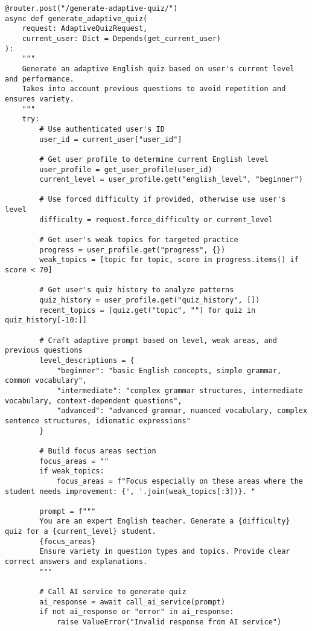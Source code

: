 \documentclass[12pt,a4paper]{article}
\begin{document}
\begin{lstlisting}[style=pythonstyle, caption=Generatore Quiz AI - Logica Adattiva, label=lst:quizgen]
@router.post("/generate-adaptive-quiz/")
async def generate_adaptive_quiz(
    request: AdaptiveQuizRequest,
    current_user: Dict = Depends(get_current_user)
):
    """
    Generate an adaptive English quiz based on user's current level and performance.
    Takes into account previous questions to avoid repetition and ensures variety.
    """
    try:
        # Use authenticated user's ID
        user_id = current_user["user_id"]
        
        # Get user profile to determine current English level
        user_profile = get_user_profile(user_id)
        current_level = user_profile.get("english_level", "beginner")
        
        # Use forced difficulty if provided, otherwise use user's level
        difficulty = request.force_difficulty or current_level
        
        # Get user's weak topics for targeted practice
        progress = user_profile.get("progress", {})
        weak_topics = [topic for topic, score in progress.items() if score < 70]
        
        # Get user's quiz history to analyze patterns
        quiz_history = user_profile.get("quiz_history", [])
        recent_topics = [quiz.get("topic", "") for quiz in quiz_history[-10:]]
        
        # Craft adaptive prompt based on level, weak areas, and previous questions
        level_descriptions = {
            "beginner": "basic English concepts, simple grammar, common vocabulary",
            "intermediate": "complex grammar structures, intermediate vocabulary, context-dependent questions",
            "advanced": "advanced grammar, nuanced vocabulary, complex sentence structures, idiomatic expressions"
        }
        
        # Build focus areas section
        focus_areas = ""
        if weak_topics:
            focus_areas = f"Focus especially on these areas where the student needs improvement: {', '.join(weak_topics[:3])}. "
        
        prompt = f"""
        You are an expert English teacher. Generate a {difficulty} quiz for a {current_level} student.
        {focus_areas}
        Ensure variety in question types and topics. Provide clear correct answers and explanations.
        """
        
        # Call AI service to generate quiz
        ai_response = await call_ai_service(prompt)
        if not ai_response or "error" in ai_response:
            raise ValueError("Invalid response from AI service")
        

\end{lstlisting}
\end{document}
